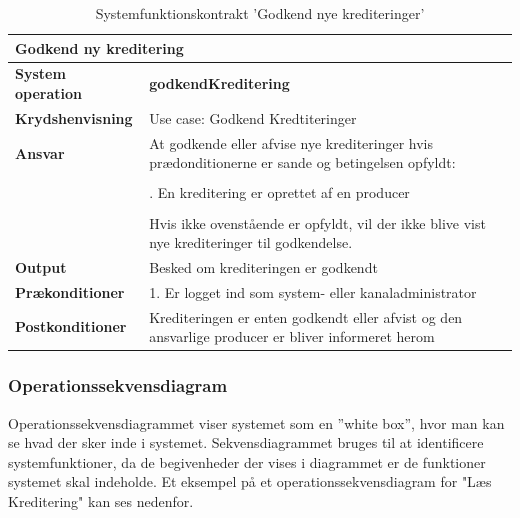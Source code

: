 \begin{table}[H]
    \begin{tabularx}{\textwidth}{|p{4cm}|X|}
        \hline
        \multicolumn{2}{|x|}{\textbf{Godkend ny kreditering}}\\
        \hline
        \textbf{System operation}       & \textbf{godkendKreditering} \\ \hline
        \textbf{Krydshenvisning}        & Use case: Godkend Kredtiteringer \\ \hline
        \textbf{Ansvar}                 & At godkende eller afvise nye krediteringer hvis prædonditionerne er sande og betingelsen opfyldt:  \\ 
                                        & \\
                                        & \quad 1. En kreditering er oprettet af en producer \\
                                        & \\
                                        & Hvis ikke ovenstående er opfyldt, vil der ikke blive vist nye krediteringer til godkendelse. \\ \hline
        \textbf{Output}                 & Besked om krediteringen er godkendt \\ \hline
        \textbf{Prækonditioner}         & 1. Er logget ind som system- eller kanaladministrator \\ \hline
        \textbf{Postkonditioner}        & Krediteringen er enten godkendt eller afvist og den ansvarlige producer er bliver informeret herom \\ \hline
    \end{tabularx}
    \caption{Systemfunktionskontrakt 'Godkend nye krediteringer'}
    \label{tab:kontrakter_Godkend_nye_krediteringer}
\end{table}



\subsubsection{Operationssekvensdiagram}
Operationssekvensdiagrammet viser systemet som en ”white box”, hvor man kan se hvad der sker inde i systemet. Sekvensdiagrammet bruges til at identificere systemfunktioner, da de begivenheder der vises i diagrammet er de funktioner systemet skal indeholde. Et eksempel på et operationssekvensdiagram for "Læs Kreditering" kan ses nedenfor.

